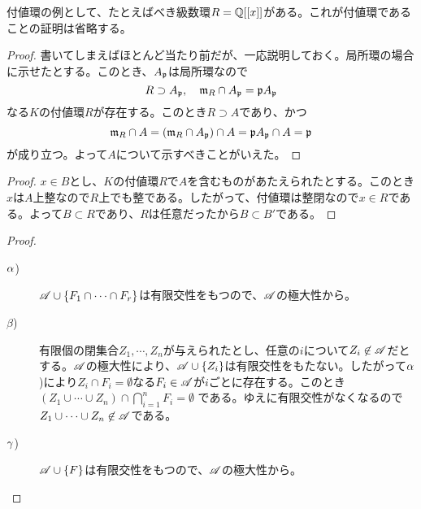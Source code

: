 
\begin{rem}
  付値環の例として、たとえばべき級数環$R = {\mathbb Q}[[x]]$がある。これが付値環であることの証明は省略する。
\end{rem}


\begin{proof}
  書いてしまえばほとんど当たり前だが、一応説明しておく。局所環の場合に示せたとする。このとき、$A_{\mathfrak{p}}$は局所環なので
  \[
  R \supset A_{\mathfrak{p}}, \quad \mathfrak{m}_{R} \cap A_{\mathfrak{p}} = \mathfrak{p} A_{\mathfrak{p}}
  \]
  なる$K$の付値環$R$が存在する。このとき$R \supset A$であり、かつ
  \[
  \mathfrak{m}_{R} \cap A = (\mathfrak{m}_{R} \cap A_{\mathfrak{p}}) \cap A = \mathfrak{p} A_{\mathfrak{p}} \cap A = \mathfrak{p}
  \]
  が成り立つ。よって$A$について示すべきことがいえた。
\end{proof}




\begin{proof}
  $x \in B$とし、$K$の付値環$R$で$A$を含むものがあたえられたとする。このとき$x$は$A$上整なので$R$上でも整である。したがって、付値環は整閉なので$x \in R$である。よって$B \subset R$であり、$R$は任意だったから$B \subset B'$である。
\end{proof}


\begin{proof} ${}$
  \begin{description}
    \item[${\alpha}$)] $\mathscr{A} \cup \{F_1 \cap \cdots \cap F_{r}\}$は有限交性をもつので、$\mathscr{A}$の極大性から。
    \item[$\beta$)] 有限個の閉集合$Z_1 , \cdots , Z_n$が与えられたとし、任意の$i$について$Z_i \not\in \mathscr{A}$だとする。$\mathscr{A}$の極大性により、$\mathscr{A} \cup \{Z_i \}$は有限交性をもたない。したがって${\alpha}$)により$Z_i \cap F_i = \emptyset $なる$F_i \in \mathscr{A}$が$i$ごとに存在する。このとき$(Z_1 \cup \cdots \cup Z_n) \cap \bigcap_{i=1}^n F_i = \emptyset$
    である。ゆえに有限交性がなくなるので$Z_1 \cup \cdots \cup Z_n \not\in \mathscr{A}$である。
    \item[${\gamma}$)] $\mathscr{A} \cup \{ F \}$は有限交性をもつので、$\mathscr{A}$の極大性から。
  \end{description}
\end{proof}




